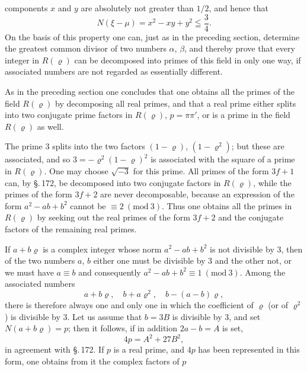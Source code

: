 components $x$ and $y$ are absolutely not greater than $1/2$, and hence that
\[
N(\xi-\mu) = x^2 - xy + y^2 \leqq \frac{3}{4}.
\]
On the basis of this property one can, just as in the preceding section, determine the greatest common divisor of two numbers $\alpha$, $\beta$, and thereby prove that every integer in $R(\varrho)$ can be decomposed into primes of this field in only one way, if associated numbers are not regarded as essentially different.

As in the preceding section one concludes that one obtains all the primes of the field $R(\varrho)$ by decomposing all real primes, and that a real prime either splits into two conjugate prime factors in $R(\varrho)$, $p=\pi\pi'$, or is a prime in the field $R(\varrho)$ as well.

The prime 3 splits into the two factors $(1-\varrho)$, $(1-\varrho^2)$; but these are associated, and so $3=-\varrho^2(1-\varrho)^2$ is associated with the square of a prime in $R(\varrho)$. One may choose $\sqrt{-3}$ for this prime. All primes of the form $3f+1$ can, by \S.\,172, be decomposed into two conjugate factors in $R(\varrho)$, while the primes of the form $3f+2$ are never decomposable, because an expression of the form $a^2-ab+b^2$ cannot be $\equiv 2\ (\mathrm{mod}\ 3)$. Thus one obtains all the primes in $R(\varrho)$ by seeking out the real primes of the form $3f+2$ and the conjugate factors of the remaining real primes.

If $a+b\varrho$ is a complex integer whose norm $a^2-ab+b^2$ is not divisible by 3, then of the two numbers $a$, $b$ either one must be divisible by 3 and the other not, or we must have $a\equiv b$ and consequently $a^2-ab+b^2\equiv 1\ (\mathrm{mod}\ 3)$. Among the associated numbers
\[
a+b\varrho,\quad b+a\varrho^2,\quad b-(a-b)\varrho,
\]
there is therefore always one and only one in which the coefficient of $\varrho$ (or of $\varrho^2$) is divisible by 3. Let us assume that $b=3B$ is divisible by 3, and set $N(a+b\varrho)=p$; then it follows, if in addition $2a-b=A$ is set,
\[
4p = A^2 + 27B^2,
\]
in agreement with \S.\,172. If $p$ is a real prime, and $4p$ has been represented in this form, one obtains from it the complex factors of $p$
